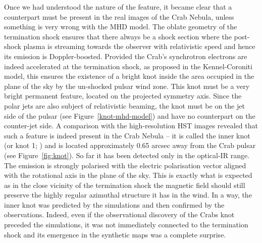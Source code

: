 Once we had understood the nature of the feature, it became clear that a counterpart must be present in the real images of the Crab Nebula, unless something is very wrong with the MHD model. The oblate geometry of the termination shock ensures that there always be a shock section where the post-shock plasma is streaming towards the observer with relativistic speed and hence its emission is Doppler-boosted.   Provided the Crab’s synchrotron electrons are indeed accelerated at the termination shock, as proposed in the Kennel-Coroniti model, this ensures the existence of a bright knot inside the area occupied in the plane of the sky by the un-shocked pulsar wind zone.  This knot must be a very bright permanent feature, located on the projected symmetry axis. Since the polar jets are also subject of relativistic beaming, the knot must be on the jet side of the pulsar (see Figure~\ref{knot-mhd-model}) and have no counterpart on the counter-jet side.      
A comparison with the high-resolution HST images revealed that such a feature is indeed present  in the Crab Nebula -- 
it is called the inner knot (or knot 1; \citet{hester-95}) and is located approximately 0.65 arcsec away from the Crab pulsar (see Figure~\ref{fig:knot}).  
So far it has been detected only in the optical-IR range.  The emission is strongly polarised with the electric polarisation vector aligned with the rotational axis in the plane of the sky. This is exactly what is expected as in the close vicinity of the termination shock the magnetic field should still preserve the highly regular azimuthal structure it has in the wind.  In a way, the inner knot was predicted by the simulations and then confirmed by the observations. Indeed, even if the observational discovery of the Crabs knot  preceded  the simulations, it was not immediately connected to the termination shock and its emergence in the synthetic maps was a complete surprise.      